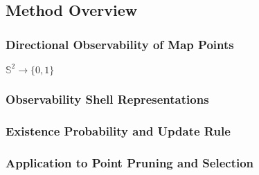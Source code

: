 \subsection{Method Overview}

\subsubsection{Directional Observability of Map Points}

$\mathbb{S}^2\rightarrow\{0, 1\}$

\subsubsection{Observability Shell Representations}

\subsubsection{Existence Probability and Update Rule}

\subsubsection{Application to Point Pruning and Selection}
